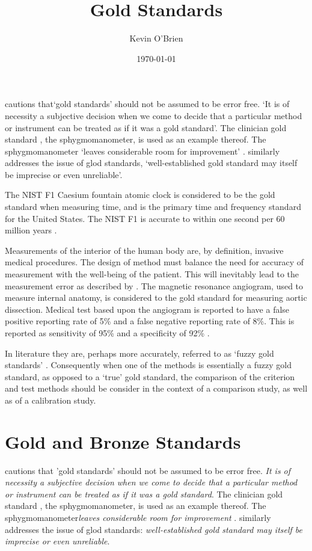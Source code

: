 \documentclass[12pt, a4paper]{article}
\begin{document}
	\author{Kevin O'Brien}
	\title{Gold Standards}
	\date{\today}
	\maketitle
	\tableofcontents
	\newpage
\citet[p.47]{DunnSEME} cautions that`gold standards' should not be
assumed to be error free. `It is of necessity a subjective
decision when we come to decide that a particular method or
instrument can be treated as if it was a gold standard'. The
clinician gold standard , the sphygmomanometer, is used as an
example thereof.  The sphygmomanometer `leaves considerable room
for improvement' \citep{DunnSEME}. \citet{pizzi} similarly
addresses the issue of glod standards, `well-established gold
standard may itself be imprecise or even unreliable'.


The NIST F1 Caesium fountain atomic clock is considered to be the
gold standard when measuring time, and is the primary time and
frequency standard for the United States. The NIST F1 is accurate
to within one second per 60 million years \citep{NIST}.

Measurements of the interior of the human body are, by definition,
invasive medical procedures. The design of method must balance the
need for accuracy of measurement with the well-being of the
patient. This will inevitably lead to the measurement error as
described by \citet{DunnSEME}. The magnetic resonance angiogram,
used to measure internal anatomy,  is considered to the gold
standard for measuring aortic dissection. Medical test based upon
the angiogram is reported to have a false positive reporting rate
of 5\% and a false negative reporting rate of 8\%. This is
reported as sensitivity of 95\% and a specificity of 92\%
\citep{ACR}.

In literature they are, perhaps more accurately, referred to as
`fuzzy gold standards' \citep{phelps}. Consequently when one of the methods is
essentially a fuzzy gold standard, as opposed to a `true' gold
standard, the comparison of the criterion and test methods should
be consider in the context of a comparison study, as well as of a
calibration study.

\section{Gold and Bronze Standards}

\noindent \citet[p.47]{DunnSEME} cautions that 'gold standards' should not be assumed to be error free. \emph{It is of necessity a subjective decision when we come to decide that a particular method or instrument can be treated as if it was a gold standard}.
The clinician gold standard , the sphygmomanometer, is used as an example thereof.  The sphygmomanometer\emph{leaves considerable room for improvement} \citep{DunnSEME}. \citet{pizzi} similarly addresses the issue of glod standards: \emph{well-established gold standard may itself be imprecise or even unreliable}.
\end{document}

